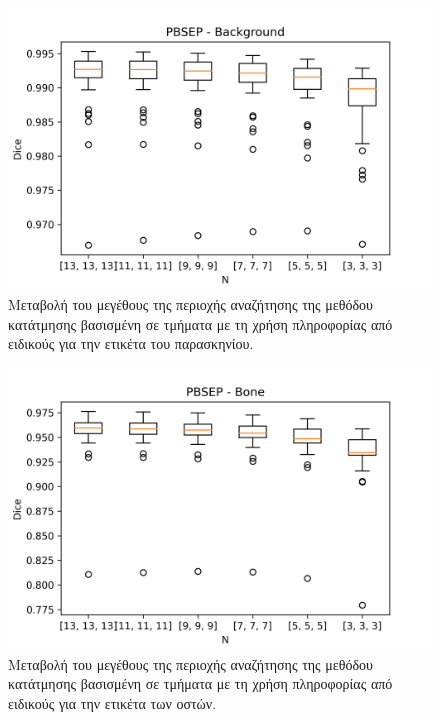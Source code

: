 \documentclass[a4paper,12pt]{article}
\begin{document}
\begin{figure}[H]
    \centering
    \includegraphics[width=0.85\linewidth]{PBSEP_N_Background_plot.png}
    \caption{Μεταβολή του μεγέθους της περιοχής αναζήτησης της μεθόδου
             κατάτμησης βασισμένη σε τμήματα με τη χρήση πληροφορίας από
             ειδικούς για την ετικέτα του παρασκηνίου.}
    \label{fig:PBSEP:N:1}
\end{figure}

\begin{figure}[H]
    \centering
    \includegraphics[width=0.85\linewidth]{PBSEP_N_Bone_plot.png}
    \caption{Μεταβολή του μεγέθους της περιοχής αναζήτησης της μεθόδου
             κατάτμησης βασισμένη σε τμήματα με τη χρήση πληροφορίας από
             ειδικούς για την ετικέτα των οστών.}
    \label{fig:PBSEP:N:2}
\end{figure}
\end{document}
